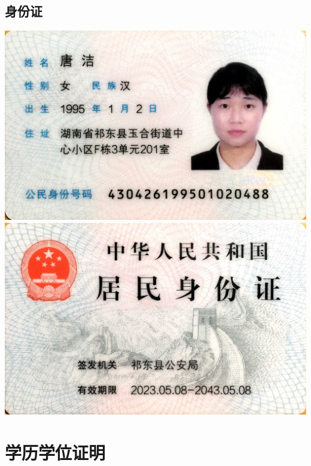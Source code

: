 \documentclass[UFT8]{ctexart}%
\begin{document}
\subsection{身份证}
\begin{center}
  \includegraphics[scale=0.12]{figs/身份证1.jpg }
  \includegraphics[scale=0.12]{figs/身份证2.jpg }
\end{center}

\section{学历学位证明}


%
%
%
%
%
%
\end{document}
